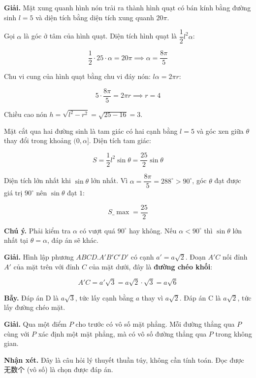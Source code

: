 \documentclass[11pt, a4paper]{article}
\begin{document}
\begin{dapan}[9 — Đáp án C]
\textbf{Giải.} Mặt xung quanh hình nón trải ra thành hình quạt có bán kính bằng đường sinh $l = 5$ và diện tích bằng diện tích xung quanh $20\pi$.

Gọi $\alpha$ là góc ở tâm của hình quạt. Diện tích hình quạt là $\dfrac{1}{2}l^2\alpha$:

$$\frac{1}{2} \cdot 25 \cdot \alpha = 20\pi \implies \alpha = \frac{8\pi}{5}$$

Chu vi cung của hình quạt bằng chu vi đáy nón: $l\alpha = 2\pi r$:

$$5 \cdot \frac{8\pi}{5} = 2\pi r \implies r = 4$$

Chiều cao nón $h = \sqrt{l^2 - r^2} = \sqrt{25-16} = 3$.

Mặt cắt qua hai đường sinh là tam giác có hai cạnh bằng $l = 5$ và góc xen giữa $\theta$ thay đổi trong khoảng $(0, \alpha]$. Diện tích tam giác:

$$S = \frac{1}{2}l^2\sin\theta = \frac{25}{2}\sin\theta$$

Diện tích lớn nhất khi $\sin\theta$ lớn nhất. Vì $\alpha = \dfrac{8\pi}{5} = 288^\circ > 90^\circ$, góc $\theta$ đạt được giá trị $90^\circ$ nên $\sin\theta$ đạt $1$:

$$S\_{\max} = \frac{25}{2}$$

\textbf{Chú ý.} Phải kiểm tra $\alpha$ có vượt quá $90^\circ$ hay không. Nếu $\alpha < 90^\circ$ thì $\sin\theta$ lớn nhất tại $\theta = \alpha$, đáp án sẽ khác.
\end{dapan}

\begin{dapan}[10 — Đáp án A]
\textbf{Giải.} Hình lập phương $ABCD.A'B'C'D'$ có cạnh $a' = a\sqrt{2}$. Đoạn $A'C$ nối đỉnh $A'$ của mặt trên với đỉnh $C$ của mặt dưới, đây là \textbf{đường chéo khối}:

$$A'C = a'\sqrt{3} = a\sqrt{2} \cdot \sqrt{3} = a\sqrt{6}$$

\textbf{Bẫy.} Đáp án D là $a\sqrt{3}$, tức lấy cạnh bằng $a$ thay vì $a\sqrt{2}$. Đáp án C là $a\sqrt{2}$, tức lấy đường chéo mặt.
\end{dapan}

\begin{dapan}[11 — Đáp án C]
\textbf{Giải.} Qua một điểm $P$ cho trước có vô số mặt phẳng. Mỗi đường thẳng qua $P$ cùng với $P$ xác định một mặt phẳng, mà có vô số đường thẳng qua $P$ trong không gian.

\textbf{Nhận xét.} Đây là câu hỏi lý thuyết thuần túy, không cần tính toán. Đọc được 无数个 (vô số) là chọn được đáp án.
\end{dapan}
\end{document}
